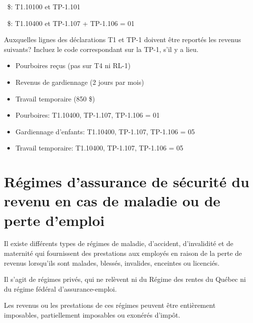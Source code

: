 ~\$: T1.10100 et TP-1.101

~\$: T1.10400 et TP-1.107 + TP-1.106 = 01

\begin{question}
	Auxquelles lignes des déclarations T1 et TP-1 doivent être reportés les revenus suivants? 
	Incluez le code correspondant sur la TP-1, s'il y a lieu.
	\begin{itemize}
		\item Pourboires reçus (pas sur T4 ni RL-1)
		\item Revenus de gardiennage (2 jours par mois)
		\item Travail temporaire (850 \$)
	\end{itemize}
\end{question}
\begin{itemize}
	\item Pourboires: T1.10400, TP-1.107, TP-1.106 = 01
	\item Gardiennage d'enfants: T1.10400, TP-1.107, TP-1.106 = 05
	\item Travail temporaire: T1.10400, TP-1.107, TP-1.106 = 05
\end{itemize}



\section{Régimes d'assurance de sécurité du revenu en cas de maladie ou de perte d'emploi}
\begin{intro}
	Il existe différents types de régimes de maladie, d'accident, d'invalidité et de maternité qui fournissent des prestations aux employés en raison de la perte de revenus lorsqu'ils sont malades, blessés, invalides, enceintes ou licenciés.
	
	Il s'agit de régimes privés, qui ne relèvent ni du Régime des rentes du Québec ni du régime fédéral d'assurance-emploi. 
	
	Les revenus ou les prestations de ces régimes peuvent être entièrement imposables, partiellement imposables ou exonérés d'impôt.
\end{intro}


